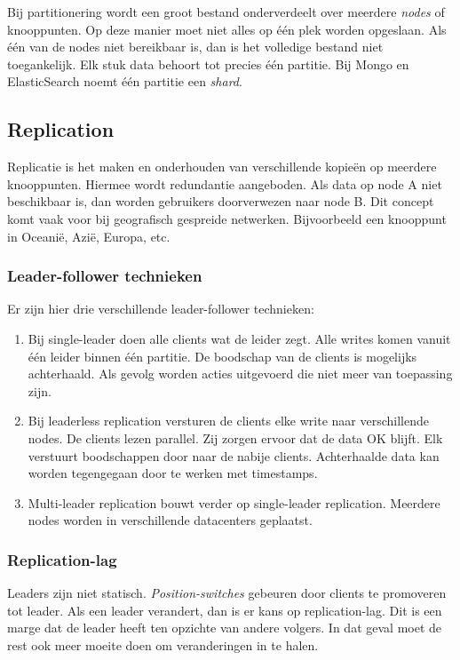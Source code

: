 \documentclass[a4paper,10pt,twoside]{report}
\begin{document}
Bij partitionering wordt een groot bestand onderverdeelt over meerdere \textit{nodes} of knooppunten. Op deze manier moet niet alles op één plek worden opgeslaan. Als één van de nodes niet bereikbaar is, dan is het volledige bestand niet toegankelijk. Elk stuk data behoort tot precies één partitie. Bij Mongo en ElasticSearch noemt één partitie een \textit{shard}.

\subsection{Replication}

Replicatie is het maken en onderhouden van verschillende kopieën op meerdere knooppunten. Hiermee wordt redundantie aangeboden. Als  data op node A niet beschikbaar is, dan worden gebruikers doorverwezen naar node B. Dit concept komt vaak voor bij geografisch gespreide netwerken. Bijvoorbeeld een knooppunt in Oceanië, Azië, Europa, etc. 

\subsubsection{Leader-follower technieken}

Er zijn hier drie verschillende leader-follower technieken: 

\begin{enumerate}
	\item  Bij single-leader doen alle clients wat de leider zegt. Alle writes komen vanuit één leider binnen één partitie. De boodschap van de clients is mogelijks achterhaald. Als gevolg worden acties uitgevoerd die niet meer van toepassing zijn. 
	\item Bij leaderless replication versturen de clients elke write naar verschillende nodes. De clients lezen parallel.  Zij zorgen ervoor dat de data OK blijft. Elk verstuurt boodschappen door naar de nabije clients. Achterhaalde data kan worden tegengegaan door te werken met timestamps.
	\item  Multi-leader replication bouwt verder op single-leader replication. Meerdere nodes worden in verschillende datacenters geplaatst.
\end{enumerate}

\subsubsection{Replication-lag}

Leaders zijn niet statisch. \textit{Position-switches} gebeuren door clients te promoveren tot leader. Als een leader verandert, dan is er kans op replication-lag. Dit is een marge dat de leader heeft ten opzichte van andere volgers. In dat geval moet de rest ook meer moeite doen om veranderingen in te halen.
\end{document}
